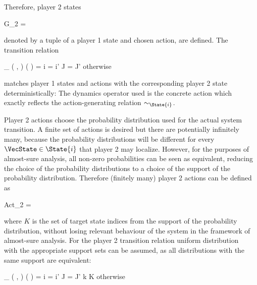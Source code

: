 Therefore, player 2 states

\startformula
    G_2 =  \EndComma
\stopformula

denoted by a tuple of a player 1 state and chosen action, are defined.
The transition relation

\startformula
    \Transition_\GameGraph
        \Big( ,  \Big)
        \Big(  \Big)
    = \startmathcases
        \MC \startgathered
                \NC \StartIf i = i' \MidAnd J = J'
                \NR
                \NC \quad \MidAnd {} \neq \emptyset
                \NR
            \stopgathered
        \NR
        \NC otherwise
        \NR
    \stopmathcases
\stopformula

matches player 1 states and actions with the corresponding player 2 state deterministically:
The dynamics operator used is the concrete action which exactly reflects the action-generating relation $\sim_{\State {i}}$.

Player 2 actions choose the probability distribution used for the actual system transition.
A finite set of actions is desired but there are potentially infinitely many, because the probability distributions will be different for every $\VecState \in \State{i}$ that player 2 may localize.
However, for the purposes of almost-sure analysis, all non-zero probabilities can be seen as equivalent, reducing the choice of the probability distributions to a choice of the support of the probability distribution. %
Therefore (finitely many) player 2 actions can be defined as

\startformula
    Act_2 =  \EndComma
\stopformula

where $K$ is the set of target state indices from the support of the probability distribution, without losing relevant behaviour of the system in the framework of almost-sure analysis.
For the player 2 transition relation uniform distribution with the appropriate support sets can be assumed, as all distributions with the same support are equivalent:

\startformula
    \Transition_\GameGraph
        \Big( ,  \Big)
        \Big(  \Big)
    = \startmathcases
        \NC \displaystyle{}
        \MC \startgathered
                \NC \StartIf i = i' \MidAnd J = J' \MidAnd k \in K
                \NR
                \NC \quad \MidAnd {} \neq \emptyset
                \NR
            \stopgathered
        \NR
        \NC otherwise \EndComma
        \NR
    \stopmathcases
\stopformula

